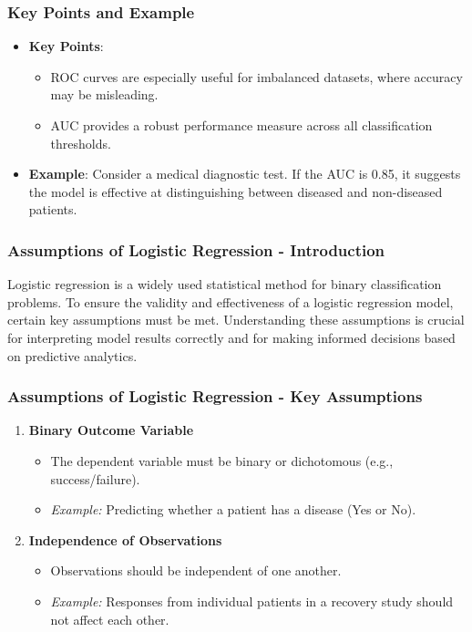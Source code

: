 \documentclass[aspectratio=169]{beamer}
\begin{document}
\begin{frame}[fragile]
    \frametitle{Key Points and Example}
    \begin{itemize}
        \item \textbf{Key Points}:
        \begin{itemize}
            \item ROC curves are especially useful for imbalanced datasets, where accuracy may be misleading.
            \item AUC provides a robust performance measure across all classification thresholds.
        \end{itemize}
        \item \textbf{Example}: Consider a medical diagnostic test. If the AUC is 0.85, it suggests the model is effective at distinguishing between diseased and non-diseased patients.
    \end{itemize}
\end{frame}

\begin{frame}[fragile]
    \frametitle{Assumptions of Logistic Regression - Introduction}
    Logistic regression is a widely used statistical method for binary classification problems. 
    To ensure the validity and effectiveness of a logistic regression model, certain key assumptions must be met. 
    Understanding these assumptions is crucial for interpreting model results correctly and for making informed decisions based on predictive analytics.
\end{frame}

\begin{frame}[fragile]
    \frametitle{Assumptions of Logistic Regression - Key Assumptions}
    \begin{enumerate}
        \item \textbf{Binary Outcome Variable}
            \begin{itemize}
                \item The dependent variable must be binary or dichotomous (e.g., success/failure).
                \item \textit{Example:} Predicting whether a patient has a disease (Yes or No).
            \end{itemize}
        \item \textbf{Independence of Observations}
            \begin{itemize}
                \item Observations should be independent of one another.
                \item \textit{Example:} Responses from individual patients in a recovery study should not affect each other.
            \end{itemize}
    \end{enumerate}
\end{frame}
\end{document}
